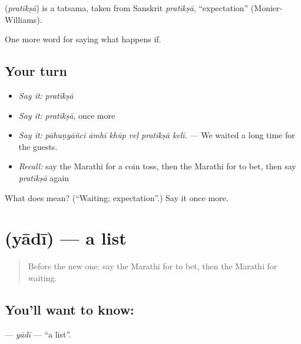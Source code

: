 \begin{cousinweb}
\textbf{} (\emph{pratīkṣā}) is a tatsama, taken from Sanskrit \emph{pratīkṣā}, \textquotedblleft{}expectation\textquotedblright{} (Monier-Williams).
\end{cousinweb}

\begin{grammarlens}[title={What you've built}]
One more word for saying what happens if.
\end{grammarlens}

\subsection*{Your turn}
\begin{itemize}
\raggedright
  \item \emph{Say it:} \emph{pratīkṣā}
  \item \emph{Say it:} \emph{pratīkṣā}, once more
  \item \emph{Say it:} \emph{pāhuṇyāñcī āmhī khūp veḷ pratīkṣā kelī.} — We waited a long time for the guests.
  \item \emph{Recall:} say the Marathi for a coin toss, then the Marathi for to bet, then say \emph{pratīkṣā} again
\end{itemize}

\begin{tcolorbox}[breakable,colback=teal!4,colframe=teal!35!black,title={Before you move on}]
What does  mean? (\textquotedblleft{}Waiting; expectation\textquotedblright{}.) Say it once more.
\end{tcolorbox}
\section[\texorpdfstring{\mr{यादी} (yādī)}{यादी (yādī)}]{ (yādī) — a list}

\label{lesson:MR-C551-yadi}



\begin{quote}
Before the new one: say the Marathi for to bet, then the Marathi for waiting.
\end{quote}

\subsection*{You'll want to know: }
\textbf{} — \emph{yādī} — \textquotedblleft{}a list\textquotedblright{}.

